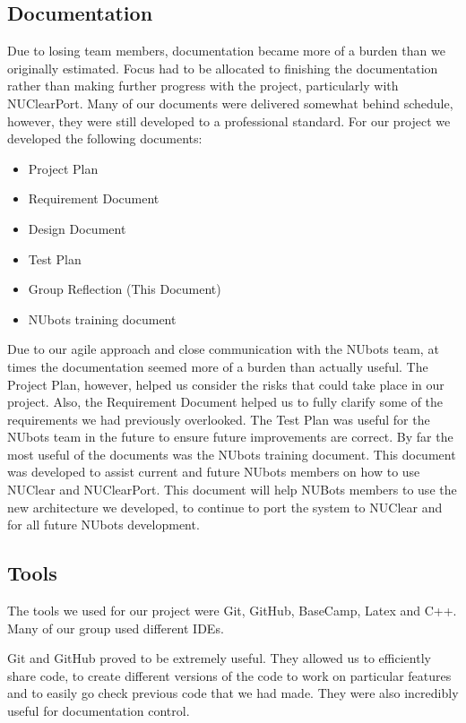 \documentclass[english,12pt]{scrartcl}
\begin{document}
	\subsection{Documentation}
		Due to losing team members, documentation became more of a burden than we originally estimated.
		Focus had to be allocated to finishing the documentation rather than making further progress with the project, particularly with NUClearPort.
		Many of our documents were delivered somewhat behind schedule, however, they were still developed to a professional standard.
		For our project we developed the following documents:
		\begin{itemize}
			\item Project Plan
			\item Requirement Document
			\item Design Document
			\item Test Plan
			\item Group Reflection (This Document)
			\item NUbots training document
		\end{itemize}

		Due to our agile approach and close communication with the NUbots team, at times the documentation seemed more of a burden than actually useful.
		The Project Plan, however, helped us consider the risks that could take place in our project.
		Also, the Requirement Document helped us to fully clarify some of the requirements we had previously overlooked.
		The Test Plan was useful for the NUbots team in the future to ensure future improvements are correct.
		By far the most useful of the documents was the NUbots training document.
		This document was developed to assist current and future NUbots members on how to use NUClear and NUClearPort.
		This document will help NUBots members to use the new architecture we developed, to continue to port the system to NUClear and for all future NUbots development.

	\subsection{Tools}
		The tools we used for our project were Git, GitHub, BaseCamp, Latex and C++.
		Many of our group used different IDEs.

		Git and GitHub proved to be extremely useful.
		They allowed us to efficiently share code, to create different versions of the code to work on particular features and to easily go check previous code that we had made. They were also incredibly useful for documentation control.
\end{document}
